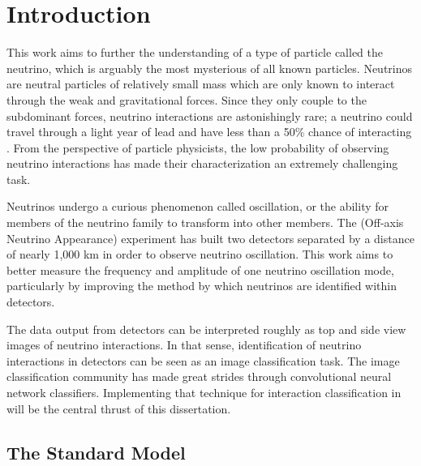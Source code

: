 \chapter{Introduction}
\label{intro_chapter}


This work aims to further the understanding of a type of particle called
the neutrino, which is arguably the most mysterious of all known particles.
Neutrinos are neutral particles of relatively small mass which are only
known to interact through the weak and gravitational forces.
Since they only couple to the subdominant forces, neutrino interactions are
astonishingly rare; a neutrino could travel through a light year of lead and
have less than a 50\% chance of interacting \cite{petit2013heart}.
From the perspective of particle
physicists, the low probability of observing neutrino interactions has made
their characterization an extremely challenging task.

Neutrinos undergo a curious phenomenon called oscillation, or the ability for
members of the neutrino family to transform into other members.  The \nova
(\numi Off-axis Neutrino Appearance)
experiment has built two detectors separated by a distance of nearly 1,000 km
in order to observe neutrino oscillation.  This work aims to better measure
the frequency and amplitude of one neutrino oscillation mode, particularly by
improving the
method by which neutrinos are identified within \nova detectors.


The data output from \nova detectors can be interpreted roughly as top and side
view images of neutrino interactions.  In that sense, identification of
neutrino interactions in \nova detectors can be seen as an image classification
task.  The image classification community has made great strides through
convolutional neural network classifiers.  Implementing that technique for
interaction classification in \nova will be the central thrust of this
dissertation.



\section{The Standard Model}


